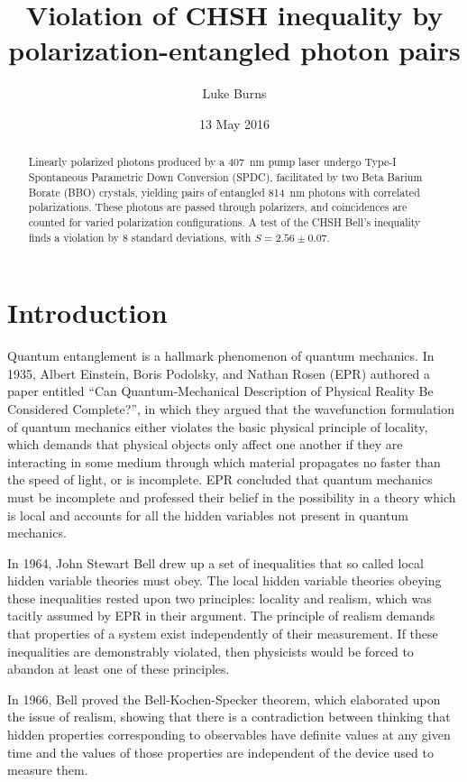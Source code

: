 \documentclass{article}
\title{Violation of CHSH inequality by polarization-entangled photon pairs}
\author{Luke Burns}
\date{13 May 2016}
\let\Oldsection\section
\renewcommand{\section}{\FloatBarrier\Oldsection}
\begin{document}
\maketitle

\begin{abstract}
  Linearly polarized photons produced by a 407~nm pump laser undergo Type-I Spontaneous Parametric Down Conversion (SPDC), facilitated by two Beta Barium Borate (BBO) crystals, yielding pairs of entangled 814~nm photons with correlated polarizations. These photons are passed through polarizers, and coincidences are counted for varied polarization configurations. A test of the CHSH Bell's inequality finds a violation by 8 standard deviations, with $S=2.56 \pm 0.07$.
\end{abstract}

\section{Introduction}

Quantum entanglement is a hallmark phenomenon of quantum mechanics. In 1935, Albert Einstein, Boris Podolsky, and Nathan Rosen (EPR) authored a paper entitled ``Can Quantum-Mechanical Description of Physical Reality Be Considered Complete?'', in which they argued that the wavefunction formulation of quantum mechanics either violates the basic physical principle of locality, which demands that physical objects only affect one another if they are interacting in some medium through which material propagates no faster than the speed of light, or is incomplete. EPR concluded that quantum mechanics must be incomplete and professed their belief in the possibility in a theory which is local and accounts for all the hidden variables not present in quantum mechanics.\cite{einstein}

In 1964, John Stewart Bell drew up a set of inequalities that so called local hidden variable theories must obey. The local hidden variable theories obeying these inequalities rested upon two principles: locality and realism, which was tacitly assumed by EPR in their argument. The principle of realism demands that properties of a system exist independently of their measurement. If these inequalities are demonstrably violated, then physicists would be forced to abandon at least one of these principles.\cite{bell}

In 1966, Bell proved the Bell-Kochen-Specker theorem, which elaborated upon the issue of realism, showing that there is a contradiction between thinking that hidden properties corresponding to observables have definite values at any given time and the values of those properties are independent of the device used to measure them.\cite{bell2}
\end{document}
